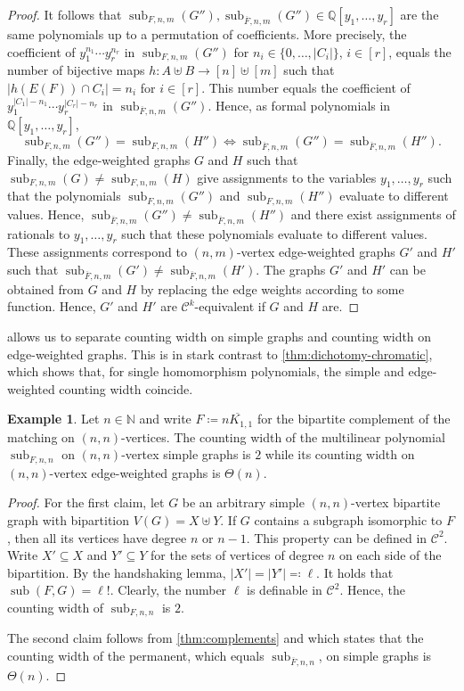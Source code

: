 \documentclass[10pt,a4paper]{article}
\theoremstyle{definition}
\newtheorem{example}[definition]{Example}
\theoremstyle{plain}
\theoremstyle{remark}
\DeclareMathOperator{\sub}{sub}
\begin{document}
\begin{proof}
		It follows that $\sub_{F, n,m}(G''), \sub_{\overline{F}, n,m}(G'') \in \mathbb{Q}[y_1, \dots, y_r]$ are the same polynomials up to a permutation of coefficients.
		More precisely,
		the coefficient of $y_1^{n_1} \cdots y_r^{n_r}$ in $\sub_{F, n,m}(G'')$ for $n_i \in \{0, \dots, |C_i|\}$, $i \in [r]$, 
		equals the number of bijective maps $h \colon A \uplus B \to [n] \uplus [m]$ such that $|h(E(F)) \cap C_i| = n_i$ for $i \in [r]$.
		This number equals the coefficient of $y_1^{|C_1| - n_1} \cdots y_r^{|C_r| - n_r}$ in $ \sub_{\overline{F}, n,m}(G'')$.
		Hence, as formal polynomials in $\mathbb{Q}[y_1, \dots, y_r]$, 
		\[
			 \sub_{F, n,m}(G'') =  \sub_{F, n,m}(H'') \iff  \sub_{\overline{F}, n,m}(G'') =  \sub_{\overline{F}, n,m}(H'').
		\]
		Finally, the edge-weighted graphs $G$ and $H$ such that $\sub_{F, n,m}(G) \neq \sub_{F, n,m}(H)$
		give assignments to the variables $y_1, \dots, y_r$ such that the polynomials $ \sub_{F, n,m}(G'')$ and $\sub_{F, n,m}(H'')$ evaluate to different values.
		Hence,  $ \sub_{\overline{F}, n,m}(G'') \neq  \sub_{\overline{F}, n,m}(H'')$
		and there exist assignments of rationals to $y_1, \dots, y_r$ such that these polynomials evaluate to different values.
		These assignments correspond to $(n,m)$-vertex edge-weighted graphs $G'$ and $H'$ such that $\sub_{\overline{F}, n,m}(G') \neq \sub_{\overline{F}, n,m}(H')$.
		The graphs $G'$ and $H'$ can be obtained from $G$ and $H$ by replacing the edge weights according to some function.
		Hence, $G'$ and $H'$ are $\mathcal{C}^k$-equivalent if $G$ and $H$ are.
	\end{proof}
	 allows us to separate counting width on simple graphs and counting width on edge-weighted graphs.
	This is in stark contrast to \cref{thm:dichotomy-chromatic}, which shows that, for single homomorphism polynomials, the simple and edge-weighted counting width coincide.
	\begin{example}\label{ex:matching}
		Let $n \in \mathbb{N}$
		and write $F \coloneqq \overline{nK_{1,1}}$ for the bipartite complement of the matching on $(n,n)$-vertices.
		The counting width of the multilinear polynomial $\sub_{F, n,n}$ on $(n,n)$-vertex simple graphs is $2$ while its counting width on $(n,n)$-vertex edge-weighted graphs is $\Theta(n)$.
	\end{example}
	\begin{proof}
		For the first claim, let $G$ be an arbitrary simple $(n,n)$-vertex bipartite graph with bipartition $V(G) = X \uplus Y$.
		If $G$ contains a subgraph isomorphic to $F$,
		then all its vertices have degree $n$ or $n-1$.
		This property can be defined in $\mathcal{C}^2$.
		Write $X' \subseteq X$ and $Y' \subseteq Y$ for the sets of vertices of degree $n$ on each side of the bipartition.
		By the handshaking lemma,  $|X'| = |Y'| \eqqcolon \ell$.
		It holds that $\sub(F,G) = \ell!$.
		Clearly, the number $\ell$ is definable in $\mathcal{C}^2$.
		Hence, the counting width of $\sub_{F,n,n}$ is $2$.

		The second claim follows from \cref{thm:complements} and \cite[Theorem~7.2]{dawar_symmetric_2025} which states that the counting width of the permanent, which equals $\sub_{\overline{F}, n,n}$, on simple graphs is $\Theta(n)$.
	\end{proof}
\end{document}
